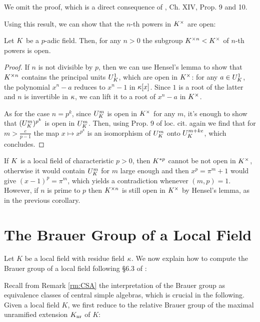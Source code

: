 \documentclass[a4paper, oneside]{memoir}
\begin{document}
We omit the proof, which is a direct consequence of \cite{SerreCL}, Ch. XIV, Prop. 9 and 10.

Using this result, we can show that the $n$-th powers in $K^\times$ are open:
\begin{corollary}\label{cor:KxOpen}
    Let $K$ be a $p$-adic field. Then, for any $n>0$ the subgroup $K^{\times n}<K^\times$ of $n$-th powers is open.
\end{corollary}
\begin{proof}
    If $n$ is not divisible by $p$, then we can use Hensel's lemma to show that $K^{\times n}$ contains the principal units $U_K^1$, which are open in $K^\times$: for any $a\in U_K^1$, the polynomial $x^n-a$ reduces to $x^{n} - 1$ in $\kappa[x]$. Since $1$ is a root of the latter and $n$ is invertible in $\kappa$, we can lift it to a root of $x^n-a$ in $K^\times$.

    As for the case $n=p^k$, since $U_K^m$ is open in $K^\times$ for any $m$, it's enough to show that $(U_K^m)^{p^k}$ is open in $U_K^m$.
    Then, using Prop. 9 of loc. cit. again we find that for $m>\frac{e}{p-1}$ the map $x\mapsto x^{p^k}$ is an isomorphism of $U_K^m$ onto $U_K^{m+ke}$, which concludes.
\end{proof}

\begin{remark}\label{rm:KxOpenCharP}
    If $K$ is a local field of characteristic $p>0$, then $K^{*p}$ cannot be not open in $K^\times$, otherwise it would contain $U_K^m$ for $m$ large enough and then $x^p = \pi^m + 1$ would give $(x-1)^p = \pi^m$, which yields a contradiction whenever $(m,p)=1$.
    However, if $n$ is prime to $p$ then $K^{\times n}$ is still open in $K^\times$ by Hensel's lemma, as in the previous corollary.
\end{remark}

\section{The Brauer Group of a Local Field}

Let $K$ be a local field with residue field $\kappa$. We now explain how to compute the Brauer group of a local field following \S 6.3 of \cite{SzamuelyGille}:

Recall from Remark \ref{rm:CSA} the interpretation of the Brauer group as equivalence classes of central simple algebras, which is crucial in the following. Given a local field $K$, we first reduce to the relative Brauer group of the maximal unramified extension $K_{\text{nr}}$ of $K$:
\end{document}
